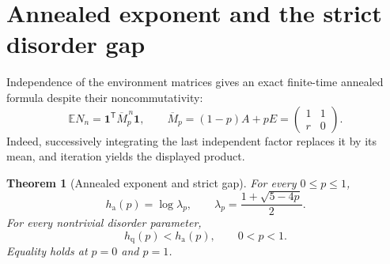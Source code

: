 \documentclass[11pt,a4paper]{amsart}
\newtheorem{theorem}{Theorem}[section]
\theoremstyle{definition}
\theoremstyle{remark}
\newcommand{\Exp}{\mathbb E}
\newcommand{\one}{\mathbf 1}
\newcommand{\hq}{h_{\mathrm q}}
\newcommand{\ha}{h_{\mathrm a}}
\begin{document}
\section{Annealed exponent and the strict disorder gap}
\label{sec:annealed}

Independence of the environment matrices gives an exact finite-time
annealed formula despite their noncommutativity:
\begin{equation}\label{eq:annealed-finite}
 \Exp N_n
 =\one^{\mathsf T}\overline M_p^{\,n}\one,
 \qquad
 \overline M_p=(1-p)A+pE
 =\begin{pmatrix}1&1\\r&0\end{pmatrix}.
\end{equation}
Indeed, successively integrating the last independent factor replaces it by
its mean, and iteration yields the displayed product.

\begin{theorem}[Annealed exponent and strict gap]\label{thm:gap}
For every $0\leq p\leq1$,
\begin{equation}\label{eq:annealed-formula}
 \boxed{\displaystyle
 \ha(p)=\log\lambda_p,
 \qquad
 \lambda_p=\frac{1+\sqrt{5-4p}}2.}
\end{equation}
For every nontrivial disorder parameter,
\begin{equation}\label{eq:strict-gap}
 \hq(p)<\ha(p),\qquad 0<p<1.
\end{equation}
Equality holds at $p=0$ and $p=1$.
\end{theorem}
\end{document}
